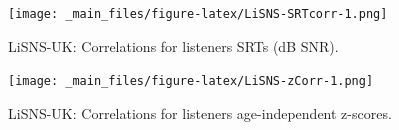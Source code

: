 \documentclass[a4paper, twoside]{templates/ociamthesis}
\newcommand*{\bibtitle}{References}
\begin{document}
\begin{figure}
\centering
\texttt{[image: \_main\_files/figure-latex/LiSNS-SRTcorr-1.png]}
\caption{\label{fig:LiSNS-SRTcorr} LiSNS-UK: Correlations for listeners SRTs (dB SNR).}
\end{figure}

\begin{figure}
\centering
\texttt{[image: \_main\_files/figure-latex/LiSNS-zCorr-1.png]}
\caption{\label{fig:LiSNS-zcorr} LiSNS-UK: Correlations for listeners age-independent z-scores.}
\end{figure}




\setlength{\baselineskip}{0pt} %

{\renewcommand*\MakeUppercase[1]{#1}%
\printbibliography[heading=bibintoc,title={\bibtitle}]}
\end{document}
